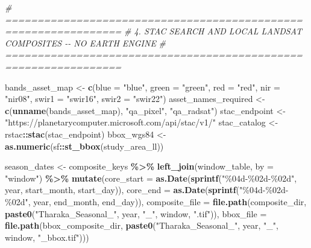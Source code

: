 \documentclass[
]{article}
\newenvironment{Shaded}{\begin{snugshade}}{\end{snugshade}}
\newcommand{\AttributeTok}[1]{\textcolor[rgb]{0.13,0.29,0.53}{#1}}
\newcommand{\CommentTok}[1]{\textcolor[rgb]{0.56,0.35,0.01}{\textit{#1}}}
\newcommand{\FunctionTok}[1]{\textcolor[rgb]{0.13,0.29,0.53}{\textbf{#1}}}
\newcommand{\NormalTok}[1]{#1}
\newcommand{\OtherTok}[1]{\textcolor[rgb]{0.56,0.35,0.01}{#1}}
\newcommand{\SpecialCharTok}[1]{\textcolor[rgb]{0.81,0.36,0.00}{\textbf{#1}}}
\newcommand{\StringTok}[1]{\textcolor[rgb]{0.31,0.60,0.02}{#1}}
\begin{document}
\begin{Shaded}
\begin{Highlighting}[]
\CommentTok{\# ================================================================}
\CommentTok{\# 4. STAC SEARCH AND LOCAL LANDSAT COMPOSITES {-}{-} NO EARTH ENGINE}
\CommentTok{\# ================================================================}

\NormalTok{bands\_asset\_map }\OtherTok{\textless{}{-}} \FunctionTok{c}\NormalTok{(}\AttributeTok{blue =} \StringTok{"blue"}\NormalTok{, }\AttributeTok{green =} \StringTok{"green"}\NormalTok{, }\AttributeTok{red =} \StringTok{"red"}\NormalTok{,}
                     \AttributeTok{nir =} \StringTok{"nir08"}\NormalTok{, }\AttributeTok{swir1 =} \StringTok{"swir16"}\NormalTok{, }\AttributeTok{swir2 =} \StringTok{"swir22"}\NormalTok{)}
\NormalTok{asset\_names\_required }\OtherTok{\textless{}{-}} \FunctionTok{c}\NormalTok{(}\FunctionTok{unname}\NormalTok{(bands\_asset\_map), }\StringTok{"qa\_pixel"}\NormalTok{, }\StringTok{"qa\_radsat"}\NormalTok{)}
\NormalTok{stac\_endpoint }\OtherTok{\textless{}{-}} \StringTok{"https://planetarycomputer.microsoft.com/api/stac/v1/"}
\NormalTok{stac\_catalog }\OtherTok{\textless{}{-}}\NormalTok{ rstac}\SpecialCharTok{::}\FunctionTok{stac}\NormalTok{(stac\_endpoint)}
\NormalTok{bbox\_wgs84 }\OtherTok{\textless{}{-}} \FunctionTok{as.numeric}\NormalTok{(sf}\SpecialCharTok{::}\FunctionTok{st\_bbox}\NormalTok{(study\_area\_ll))}

\NormalTok{season\_dates }\OtherTok{\textless{}{-}}\NormalTok{ composite\_keys }\SpecialCharTok{\%\textgreater{}\%}
  \FunctionTok{left\_join}\NormalTok{(window\_table, }\AttributeTok{by =} \StringTok{"window"}\NormalTok{) }\SpecialCharTok{\%\textgreater{}\%}
  \FunctionTok{mutate}\NormalTok{(}\AttributeTok{core\_start =} \FunctionTok{as.Date}\NormalTok{(}\FunctionTok{sprintf}\NormalTok{(}\StringTok{"\%04d{-}\%02d{-}\%02d"}\NormalTok{, year, start\_month, start\_day)),}
         \AttributeTok{core\_end =} \FunctionTok{as.Date}\NormalTok{(}\FunctionTok{sprintf}\NormalTok{(}\StringTok{"\%04d{-}\%02d{-}\%02d"}\NormalTok{, year, end\_month, end\_day)),}
         \AttributeTok{composite\_file =} \FunctionTok{file.path}\NormalTok{(composite\_dir, }\FunctionTok{paste0}\NormalTok{(}\StringTok{"Tharaka\_Seasonal\_"}\NormalTok{, year, }\StringTok{"\_"}\NormalTok{, window, }\StringTok{".tif"}\NormalTok{)),}
         \AttributeTok{bbox\_file =} \FunctionTok{file.path}\NormalTok{(bbox\_composite\_dir, }\FunctionTok{paste0}\NormalTok{(}\StringTok{"Tharaka\_Seasonal\_"}\NormalTok{, year, }\StringTok{"\_"}\NormalTok{, window, }\StringTok{"\_bbox.tif"}\NormalTok{)))}


\end{Highlighting}
\end{Shaded}
\end{document}
